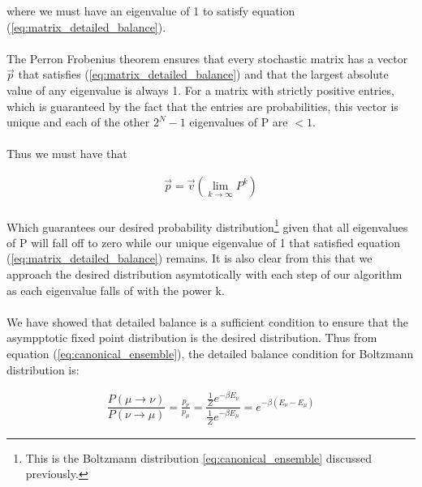 \documentclass[12pt] {report} %
\begin{document}
			where we must have an eigenvalue of 1 to satisfy equation (\ref{eq:matrix_detailed_balance}).
			
			\paragraph{}
				The Perron Frobenius theorem \cite{Perron-Frobenius} ensures that every stochastic matrix has a vector $\vec{p}$ that satisfies (\ref{eq:matrix_detailed_balance}) and that the largest absolute value of any eigenvalue is always 1. For a matrix with strictly positive entries, which is guaranteed by the fact that the entries are probabilities, this vector is unique and each of the other $2^N - 1$ eigenvalues of P are $< 1$.
			
			\paragraph{}	
				Thus we must have that 
			
			\begin{align}
				\vec{p} = \vec{v} (\lim_{k\to\infty} P^k)
			\end{align}
			
			\paragraph{}
				Which guarantees our desired probability distribution\footnote{This is the Boltzmann distribution \ref{eq:canonical_ensemble} discussed previously.} given that all eigenvalues of P will fall off to zero while our unique eigenvalue of 1 that satisfied equation (\ref{eq:matrix_detailed_balance}) remains. It is also clear from this that we approach the desired distribution asymtotically with each step of our algorithm as each eigenvalue falls of with the power k.
				
			\paragraph{}
				We have showed that detailed balance is a sufficient condition to ensure that the asympptotic fixed point distribution is the desired distribution. Thus from equation (\ref{eq:canonical_ensemble}), the detailed balance condition for Boltzmann distribution is:
				
			\begin{align}
				\dfrac{P(\mu \rightarrow \nu)}{P(\nu \rightarrow \mu)} = \frac{p_\nu}{p_\mu} = \dfrac{\frac{1}{Z}e^{- \beta E_\nu}}{\frac{1}{Z}e^{- \beta E_\mu}} = e^{- \beta (E_\nu - E_\mu)}	\label{eq:detailed_balance_canonical}
			\end{align}
			
\end{document}
